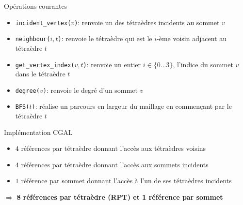 \documentclass[9pt]{beamer}
\begin{document}
\begin{frame}
\begin{block}{Opérations courantes}
\begin{itemize}
\item \texttt{incident\_vertex($v$)}: renvoie un des tétraèdres incidents au sommet $v$
\item \texttt{neighbour($i, t$)}: renvoie le tétraèdre qui est le $i$-ème voisin adjacent au tétraèdre $t$
\item \texttt{get\_vertex\_index($v,t$)}: renvoie un entier $i\in\{0 \ldots 3 \}$, l'indice du sommet $v$ dans le tétraèdre $t$
\item \texttt{degree($v$)}: renvoie le degré d'un sommet $v$
\item  \texttt{BFS($t$)}: réalise un parcours en largeur du maillage en commen\c cant par le tétraèdre $t$
\end{itemize}
\end{block}
\vspace{-3.5pt}
\begin{block}{Implémentation CGAL}
\begin{itemize}
\item $4$ références par tétraèdre donnant l'accès aux tétraèdres voisins
\item $4$ références par tétraèdre donnant l'accès aux sommets incidents
\item $1$ référence par sommet donnant l'accès à l'un de ses tétraèdres incidents
\end{itemize}
$\Rightarrow$ \textbf{8 références par tétraèdre (RPT) et 1 référence par sommet}
\end{block}
\end{frame}

\end{document}
